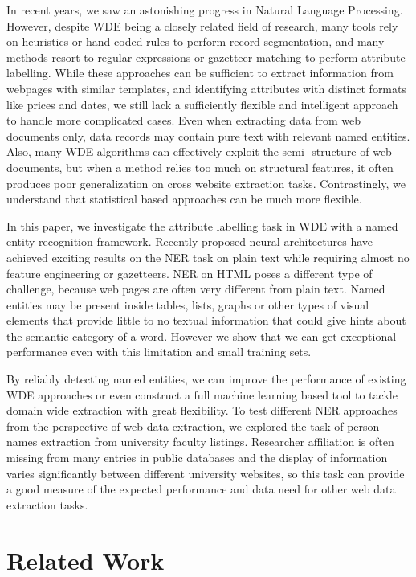 \documentclass[sigconf]{acmart}
\begin{document}
In recent years, we saw an astonishing progress in Natural Language Processing.
However, despite WDE being a closely related field of research,
many tools rely on heuristics or hand coded rules to perform record segmentation,
and many methods resort to regular expressions or gazetteer matching to perform attribute
labelling. While these approaches can be sufficient to extract information from webpages
with similar templates, and identifying attributes with distinct formats like prices and
dates, we still lack a sufficiently flexible and intelligent approach to handle more complicated cases.
Even when extracting data from web documents only, data records may contain pure text with 
relevant named entities. Also, many WDE algorithms can effectively exploit the semi-
structure of web documents, but when a method relies too much on structural features, it
often produces poor generalization on cross website extraction tasks. Contrastingly, we 
understand that statistical based approaches can be much more flexible.

In this paper, we investigate the attribute labelling task in WDE with a named entity 
recognition framework. Recently proposed neural architectures have achieved exciting results 
on the NER task on plain text \cite{Huang2015, Lample2016, Ma2016} while requiring almost 
no feature engineering or gazetteers. NER on HTML poses a different type of challenge, 
because web pages are often very different from plain text. Named entities may be present 
inside tables, lists, graphs or other types of visual elements that provide
little to no textual information that could give hints about the semantic category of 
a word. However we show that we can get exceptional performance even with this limitation
and small training sets.

By reliably detecting named entities, we can improve the performance of existing WDE 
approaches or even construct a full machine learning based tool to tackle domain wide
extraction with great flexibility. To test different NER approaches from the perspective 
of web data extraction,
we explored the task of person names extraction from university faculty listings.
Researcher affiliation is often missing from many entries in public databases 
and the display of information varies significantly between different university 
websites, so this task can provide a good measure of the expected performance and
data need for other web data extraction tasks. 

\section{Related Work}
\end{document}
